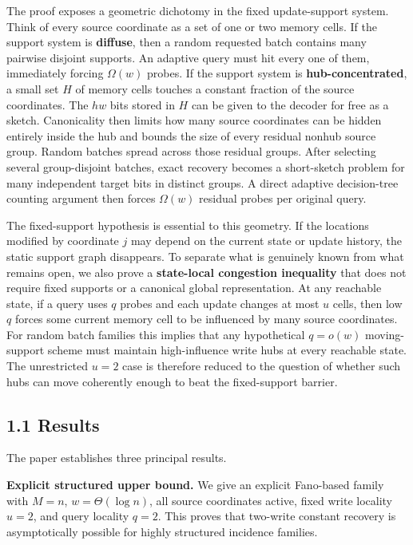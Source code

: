 \documentclass[
]{article}
\begin{document}
The proof exposes a geometric dichotomy in the fixed update-support
system. Think of every source coordinate as a set of one or two memory
cells. If the support system is \textbf{diffuse}, then a random
requested batch contains many pairwise disjoint supports. An adaptive
query must hit every one of them, immediately forcing \(\Omega(w)\)
probes. If the support system is \textbf{hub-concentrated}, a small set
\(H\) of memory cells touches a constant fraction of the source
coordinates. The \(hw\) bits stored in \(H\) can be given to the decoder
for free as a sketch. Canonicality then limits how many source
coordinates can be hidden entirely inside the hub and bounds the size of
every residual nonhub source group. Random batches spread across those
residual groups. After selecting several group-disjoint batches, exact
recovery becomes a short-sketch problem for many independent target bits
in distinct groups. A direct adaptive decision-tree counting argument
then forces \(\Omega(w)\) residual probes per original query.

The fixed-support hypothesis is essential to this geometry. If the
locations modified by coordinate \(j\) may depend on the current state
or update history, the static support graph disappears. To separate what
is genuinely known from what remains open, we also prove a
\textbf{state-local congestion inequality} that does not require fixed
supports or a canonical global representation. At any reachable state,
if a query uses \(q\) probes and each update changes at most \(u\)
cells, then low \(q\) forces some current memory cell to be influenced
by many source coordinates. For random batch families this implies that
any hypothetical \(q=o(w)\) moving-support scheme must maintain
high-influence write hubs at every reachable state. The unrestricted
\(u=2\) case is therefore reduced to the question of whether such hubs
can move coherently enough to beat the fixed-support barrier.

\hypertarget{results}{%
\subsection{1.1 Results}\label{results}}

The paper establishes three principal results.

\textbf{Explicit structured upper bound.} We give an explicit Fano-based
family with \(M=n\), \(w=\Theta(\log n)\), all source coordinates
active, fixed write locality \(u=2\), and query locality \(q=2\). This
proves that two-write constant recovery is asymptotically possible for
highly structured incidence families.
\end{document}

